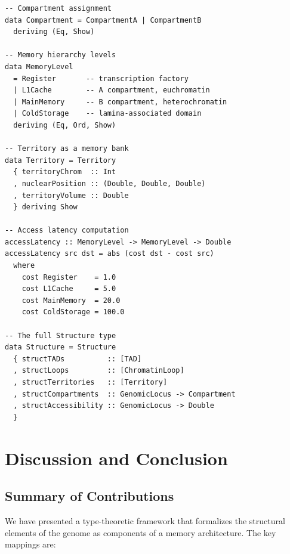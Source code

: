 \documentclass[12pt,a4paper]{article}
\theoremstyle{plain}
\theoremstyle{definition}
\begin{document}
\begin{lstlisting}[language=DNALang, caption={Nuclear memory hierarchy}]
-- Compartment assignment
data Compartment = CompartmentA | CompartmentB
  deriving (Eq, Show)

-- Memory hierarchy levels
data MemoryLevel
  = Register       -- transcription factory
  | L1Cache        -- A compartment, euchromatin
  | MainMemory     -- B compartment, heterochromatin
  | ColdStorage    -- lamina-associated domain
  deriving (Eq, Ord, Show)

-- Territory as a memory bank
data Territory = Territory
  { territoryChrom  :: Int
  , nuclearPosition :: (Double, Double, Double)
  , territoryVolume :: Double
  } deriving Show

-- Access latency computation
accessLatency :: MemoryLevel -> MemoryLevel -> Double
accessLatency src dst = abs (cost dst - cost src)
  where
    cost Register    = 1.0
    cost L1Cache     = 5.0
    cost MainMemory  = 20.0
    cost ColdStorage = 100.0

-- The full Structure type
data Structure = Structure
  { structTADs          :: [TAD]
  , structLoops         :: [ChromatinLoop]
  , structTerritories   :: [Territory]
  , structCompartments  :: GenomicLocus -> Compartment
  , structAccessibility :: GenomicLocus -> Double
  }
\end{lstlisting}


\section{Discussion and Conclusion}\label{sec:discussion}

\subsection{Summary of Contributions}

We have presented a type-theoretic framework that formalizes the structural elements of the genome as components of a memory architecture. The key mappings are:
\end{document}
